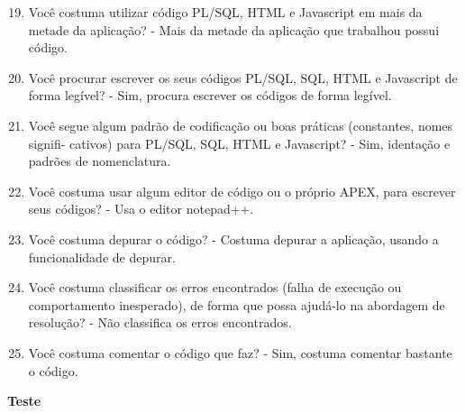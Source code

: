 \begin{anexosenv}
\begin{enumerate}
\setcounter{enumi}{18}
\item Você costuma utilizar código PL/SQL, HTML e Javascript em mais da metade da
aplicação?\newline
- Mais da metade da aplicação que trabalhou possui código.
\item Você procurar escrever os seus códigos PL/SQL, SQL, HTML e Javascript de forma
legível?\newline
- Sim, procura escrever os códigos de forma legível.
\item Você segue algum padrão de codificação ou boas práticas (constantes, nomes signifi-
cativos) para PL/SQL, SQL, HTML e Javascript?\newline
- Sim, identação e padrões de nomenclatura.
\item Você costuma usar algum editor de código ou o próprio APEX, para escrever seus
códigos?\newline
- Usa o editor notepad++.
\item Você costuma depurar o código?\newline
- Costuma depurar a aplicação, usando a funcionalidade de depurar.
\item Você costuma classificar os erros encontrados (falha de execução ou comportamento
inesperado), de forma que possa ajudá-lo na abordagem de resolução?\newline
- Não classifica os erros encontrados.
\item Você costuma comentar o código que faz?\newline
- Sim, costuma comentar bastante o código.
\end{enumerate}

\textbf{Teste}


\end{anexosenv}
